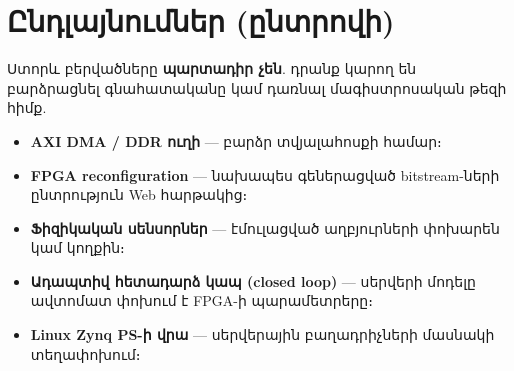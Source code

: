 \chapter{Ընդլայնումներ (ընտրովի)}
\label{ch:extensions}

Ստորև բերվածները \textbf{պարտադիր չեն}. դրանք կարող են բարձրացնել գնահատականը կամ դառնալ մագիստրոսական թեզի հիմք.
\begin{itemize}
  \item \textbf{AXI DMA / DDR ուղի} — բարձր տվյալահոսքի համար։
  \item \textbf{FPGA reconfiguration} — նախապես գեներացված bitstream-ների ընտրություն Web հարթակից։
  \item \textbf{Ֆիզիկական սենսորներ} — էմուլացված աղբյուրների փոխարեն կամ կողքին։
  \item \textbf{Ադապտիվ հետադարձ կապ (closed loop)} — սերվերի մոդելը ավտոմատ փոխում է FPGA-ի պարամետրերը։
  \item \textbf{Linux Zynq PS-ի վրա} — սերվերային բաղադրիչների մասնակի տեղափոխում։
\end{itemize}
